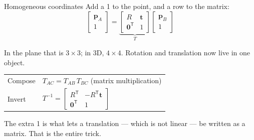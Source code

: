 \documentclass[aspectratio=169]{beamer}
\begin{document}
\begin{frame}{Homogeneous coordinates}
  \small
  Add a 1 to the point, and a row to the matrix:
  \[
    \begin{bmatrix} \mathbf{p}_A \\ 1 \end{bmatrix}
    =
    \underbrace{\begin{bmatrix} R & \mathbf{t} \\ \mathbf{0}^{\mathsf T} & 1 \end{bmatrix}}_{T}
    \begin{bmatrix} \mathbf{p}_B \\ 1 \end{bmatrix}
  \]

  \vspace{0.3em}
  In the plane that is $3\times3$; in 3D, $4\times4$. Rotation and translation now live in one
  object.

  \vspace{0.5em}
  \begin{center}
  \begin{tabular}{@{}ll@{}}
    \toprule
    Compose & $T_{AC} = T_{AB}\,T_{BC}$ \qquad (matrix multiplication) \\
    Invert  & $T^{-1} = \begin{bmatrix} R^{\mathsf T} & -R^{\mathsf T}\mathbf{t} \\
                        \mathbf{0}^{\mathsf T} & 1\end{bmatrix}$ \\
    \bottomrule
  \end{tabular}
  \end{center}

  \vspace{0.4em}
  \footnotesize
  The extra 1 is what lets a translation --- which is not linear --- be written as a matrix.
  That is the entire trick.
\end{frame}
\end{document}
